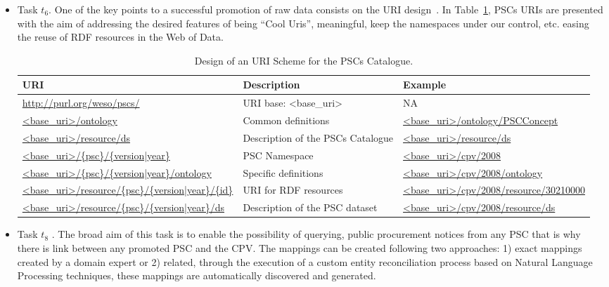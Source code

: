 \begin{itemize}
\item Task $t_6$. One of the key points to a successful promotion of raw data consists on the URI 
design~\cite{Heath_Bizer_2011}. In Table~\ref{table:pscs-uri}, PSCs URIs are presented with the aim of addressing the desired features 
of being ``Cool Uris'', meaningful, keep the namespaces under our control, etc. 
easing the reuse of RDF resources in the Web of Data.
 
 
 \begin{table}[!ht]
\renewcommand{\arraystretch}{1.3}
\begin{center}
\begin{tabular}[c]{|p{5cm}|p{4.5cm}|p{5cm}|} 
\hline
  \textbf{URI} &  \textbf{Description} & \textbf{Example} \\\hline
  \url{http://purl.org/weso/pscs/} & URI base: <base\_uri> & NA \\ \hline
  \url{<base_uri>/ontology} & Common definitions & \url{<base_uri>/ontology/PSCConcept} \\ \hline
  \url{<base_uri>/resource/ds} & Description of the PSCs Catalogue & \url{<base_uri>/resource/ds} \\ \hline
  \url{<base_uri>/{psc}/{version|year}} & PSC Namespace & \url{<base_uri>/cpv/2008} \\ \hline
  \url{<base_uri>/{psc}/{version|year}/ontology} & Specific definitions & \url{<base_uri>/cpv/2008/ontology} \\ \hline
  \url{<base_uri>/resource/{psc}/{version|year}/{id}} & URI for RDF resources & \url{<base_uri>/cpv/2008/resource/30210000} \\ \hline
  \url{<base_uri>/resource/{psc}/{version|year}/ds} & Description of the PSC dataset  & \url{<base_uri>/cpv/2008/resource/ds} \\ \hline
\hline
\end{tabular}
\caption{Design of an URI Scheme for the PSCs Catalogue.}\label{table:pscs-uri}
  \end{center}
\end{table} 

\item Task $t_8$ . The broad aim of this task is to enable the possibility of querying, 
public procurement notices from any PSC that is why there is link between any promoted PSC and the CPV. 
The mappings can be created following two approaches: 1) exact mappings created by a domain expert or 2) related, 
through the execution of a custom entity reconciliation process based on Natural Language Processing techniques, 
these mappings are automatically discovered and generated.

\end{itemize}
